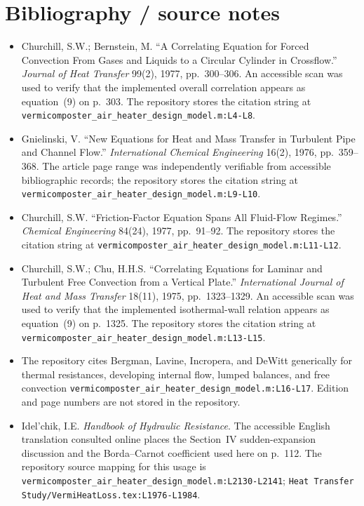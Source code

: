 \documentclass[11pt]{article}
\newcommand{\srcref}[1]{\nolinkurl{#1}}
\begin{document}
\section{Bibliography / source notes}
\begin{itemize}[leftmargin=*]
\item [R1] Churchill, S.W.; Bernstein, M. ``A Correlating Equation for Forced Convection From Gases and Liquids to a Circular Cylinder in Crossflow.'' \emph{Journal of Heat Transfer} 99(2), 1977, pp.~300--306. An accessible scan was used to verify that the implemented overall correlation appears as equation~(9) on p.~303. The repository stores the citation string at \srcref{vermicomposter_air_heater_design_model.m:L4-L8}.
\item [R2] Gnielinski, V. ``New Equations for Heat and Mass Transfer in Turbulent Pipe and Channel Flow.'' \emph{International Chemical Engineering} 16(2), 1976, pp.~359--368. The article page range was independently verifiable from accessible bibliographic records; the repository stores the citation string at \srcref{vermicomposter_air_heater_design_model.m:L9-L10}.
\item [R3] Churchill, S.W. ``Friction-Factor Equation Spans All Fluid-Flow Regimes.'' \emph{Chemical Engineering} 84(24), 1977, pp.~91--92. The repository stores the citation string at \srcref{vermicomposter_air_heater_design_model.m:L11-L12}.
\item [R4] Churchill, S.W.; Chu, H.H.S. ``Correlating Equations for Laminar and Turbulent Free Convection from a Vertical Plate.'' \emph{International Journal of Heat and Mass Transfer} 18(11), 1975, pp.~1323--1329. An accessible scan was used to verify that the implemented isothermal-wall relation appears as equation~(9) on p.~1325. The repository stores the citation string at \srcref{vermicomposter_air_heater_design_model.m:L13-L15}.
\item [R5] The repository cites Bergman, Lavine, Incropera, and DeWitt generically for thermal resistances, developing internal flow, lumped balances, and free convection \srcref{vermicomposter_air_heater_design_model.m:L16-L17}. Edition and page numbers are not stored in the repository.
\item [R6] Idel'chik, I.E. \emph{Handbook of Hydraulic Resistance}. The accessible English translation consulted online places the Section~IV sudden-expansion discussion and the Borda--Carnot coefficient used here on p.~112. The repository source mapping for this usage is \srcref{vermicomposter_air_heater_design_model.m:L2130-L2141}; \srcref{Heat Transfer Study/VermiHeatLoss.tex:L1976-L1984}.

\end{itemize}
\end{document}
